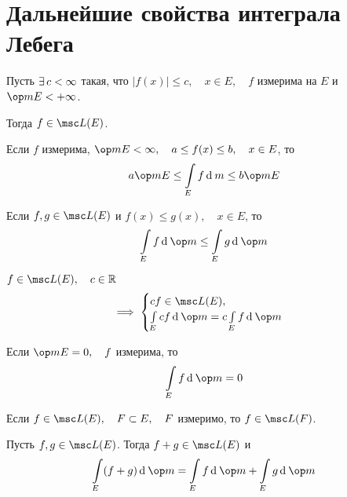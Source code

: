 \section{Дальнейшие свойства интеграла Лебега}

\begin{props}
	\item Пусть $ \exists\, c < \infty $ такая, что $ |f(x)| \le c, \quad x \in E, \quad f $ измерима на $ E $ и $ \op m E < +\infty $.

	Тогда $ f \in \msc L(E) $.

	\item Если $ f $ измерима, $ \op m E < \infty, \quad a \le f(x) \le b, \quad x \in E $, то
	$$ a \op m E \le \int\limits_E f \di m \le b \op m E $$

	\item Если $ f, g \in \msc L(E) $ и $ f(x) \le g(x), \quad x \in E $, то
	$$ \int\limits_E f \di \op m \le \int\limits_E g \di \op m $$

	\item $ f \in \msc L(E), \quad c \in \R $
	$$ \implies
	\begin{cases}
		cf \in \msc L(E), \\
		\int\limits_E cf \di \op m = c \int\limits_E f \di \op m
	\end{cases} $$

	\item Если $ \op m E = 0, \quad f $ измерима, то
	$$ \int\limits_E f \di \op m = 0 $$

	\item \label{en:lebeg_int_props:6} Если $ f \in \msc L(E), \quad F \sub E, \quad F $ измеримо, то $ f \in \msc L(F) $.

	\item Пусть $ f, g \in \msc L(E) $. Тогда $ f + g \in \msc L(E) $ и
	$$ \int\limits_E (f + g) \di \op m = \int\limits_E f \di \op m + \int\limits_E g \di \op m $$
\end{props}

